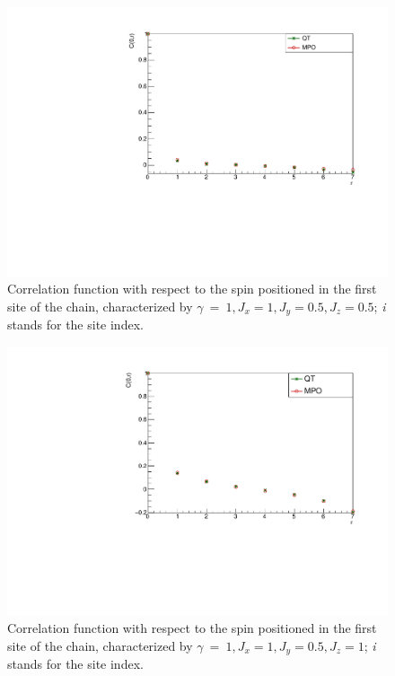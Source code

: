 \begin{figure}[H]
    \centering
    \includegraphics[scale=0.7]{Figures/8sites/CorrFunc1_8s_J10505.pdf}
    \caption{Correlation function with respect to the spin positioned in the first site of the chain, characterized by $\gamma~=~1, J_x=1, J_y=0.5, J_z=0.5$; \emph{i} stands for the site index.}
    \label{fig:my_label}
\end{figure}

\begin{figure}[H]
    \centering
    \includegraphics[scale=0.7]{Figures/8sites/CorrFunc1_8s_J1051.pdf}
    \caption{Correlation function with respect to the spin positioned in the first site of the chain, characterized by $\gamma~=~1, J_x=1, J_y=0.5, J_z=1$; \emph{i} stands for the site index.}
    \label{fig:my_label}
\end{figure}

